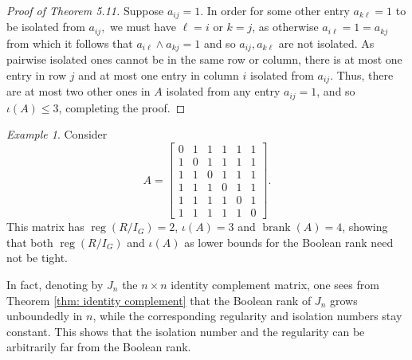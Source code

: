 \documentclass[11pt,letterpaper, reqno]{amsart}
\theoremstyle{definition}
\theoremstyle{remark}
\newtheorem{example}[theorem]{Example}
\DeclareMathOperator{\reg}{reg}
\DeclareMathOperator{\brank}{brank}
\numberwithin{equation}{section}
\begin{document}
\begin{proof}[Proof of Theorem 5.11]
Suppose $a_{ij} = 1$.
In order for some other entry $a_{k\ell} = 1$ to be isolated from $a_{ij},$ we must have $\ell = i$ or $k = j$, as otherwise $a_{i\ell} = 1 = a_{kj}$ from which it follows that $a_{i\ell}\wedge a_{kj} = 1$ and so $a_{ij}, a_{k\ell}$ are not isolated.
As pairwise isolated ones cannot be in the same row or column, there is at most one entry in row $j$ and at most one entry in column $i$ isolated from $a_{ij}$.
Thus, there are at most two other ones in $A$ isolated from any entry $a_{ij} =1$, and so $\iota(A) \leq 3$, completing the proof.
\end{proof}
 
\begin{example}\label{ex: anti id example}
Consider
\[
A=\begin{bmatrix}
    0&1&1&1&1&1\\
    1&0&1&1&1&1\\
    1&1&0&1&1&1\\
    1&1&1&0&1&1\\
    1&1&1&1&0&1\\
    1&1&1&1&1&0
\end{bmatrix}. 
\]
This matrix has $\reg(R/I_G)=2$, $\iota(A)=3$ and $\brank(A)=4$, showing that both $\reg(R/I_G)$ and $\iota(A)$ as lower bounds for the Boolean rank need not be tight. 

In fact, denoting by $J_n$ the $n\times n$ identity complement matrix, one sees from Theorem \ref{thm: identity complement} that the  Boolean rank of $J_n$ grows unboundedly in $n$, while the corresponding regularity and isolation numbers stay constant. This shows that the isolation number and the regularity can be arbitrarily far from the Boolean rank.%
\end{example}
\end{document}
